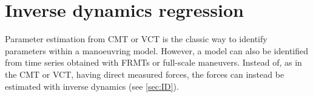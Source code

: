 \section{Inverse dynamics regression} \label{sec:IDR}
Parameter estimation from CMT or VCT is the classic way to identify parameters within a manoeuvring model. However, a model can also be identified from time series obtained with FRMTs or full-scale maneuvers. Instead of, as in the CMT or VCT, having direct measured forces, the forces can instead be estimated with inverse dynamics (see \autoref{sec:ID}). 

